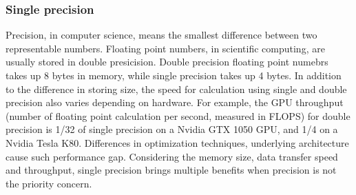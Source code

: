 \documentclass[9pt,twocolumn,twoside,lineno]{gsag3jnl}
\begin{document}
\subsubsection{Single precision}
Precision, in computer science, means the smallest difference between two representable numbers.
Floating point numbers, in scientific computing, are usually stored in double presicision. 
Double precision floating point numebrs takes up 8 bytes in memory, while single precision takes up 4 bytes. 
In addition to the difference in storing size, the speed for calculation using single and double precision also varies depending on hardware. 
For example, the GPU throughput (number of floating point calculation per second, measured in FLOPS) for double precision is 1/32 of single precision on a Nvidia GTX 1050 GPU, and 1/4 on a Nvidia Tesla K80. 
Differences in optimization techniques, underlying architecture cause such performance gap. 
Considering the memory size, data transfer speed and throughput, single precision brings multiple benefits when precision is not the priority concern. 
\end{document}
